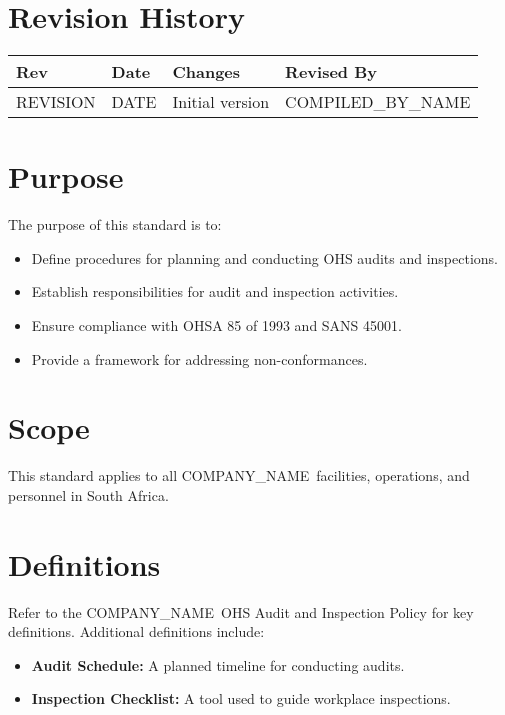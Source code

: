 \documentclass[11pt]{article}
\newcommand{\issueDate}{{{DATE}}}
\newcommand{\clientName}{{{COMPANY_NAME}}}
\newcommand{\compilerName}{{{COMPILED_BY_NAME}}}
\newcommand{\revision}{{{REVISION}}}
\begin{document}
\section{Revision History}
\begin{tabularx}{\textwidth}{lXll}
  \toprule
  \textbf{Rev} & \textbf{Date} & \textbf{Changes} & \textbf{Revised By} \\
  \midrule
  \revision & \issueDate & Initial version & \compilerName \\
  \bottomrule
\end{tabularx}

\section{Purpose}
The purpose of this standard is to:
\begin{itemize}
    \item Define procedures for planning and conducting OHS audits and inspections.
    \item Establish responsibilities for audit and inspection activities.
    \item Ensure compliance with OHSA 85 of 1993 and SANS 45001.
    \item Provide a framework for addressing non-conformances.
\end{itemize}

\section{Scope}
This standard applies to all \clientName\ facilities, operations, and personnel in South Africa.

\section{Definitions}
Refer to the \clientName\ OHS Audit and Inspection Policy for key definitions. Additional definitions include:
\begin{itemize}
    \item \textbf{Audit Schedule:} A planned timeline for conducting audits.
    \item \textbf{Inspection Checklist:} A tool used to guide workplace inspections.
\end{itemize}
\end{document}
